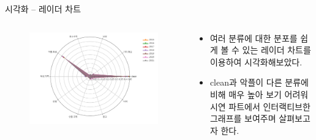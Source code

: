 \documentclass[mathserif, aspectratio=169]{beamer}
\begin{document}
\begin{frame}{시각화 -- 레이더 차트}
    \begin{columns}
        \begin{column}{0.5\linewidth}
            \centering
            \begin{figure}
                \includegraphics[width = \linewidth]{images/radarchart.pdf}
            \end{figure}
        \end{column}
        \begin{column}{0.5\linewidth}
            \justifying
            \begin{itemize}
                \justifying
                \item 여러 분류에 대한 분포를 쉽게 볼 수 있는 레이더 차트를 이용하여 시각화해보았다.
                \item clean과 악플이 다른 분류에 비해 매우 높아 보기 어려워 시연 파트에서 인터랙티브한 그래프를 보여주며 살펴보고자 한다.
            \end{itemize}
        \end{column}
    \end{columns}
\end{frame}
\end{document}
